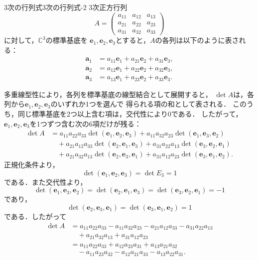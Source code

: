\begin{example}{3次の行列式}{3次の行列式-2}
  $3$次正方行列
  \[
    A=
    \begin{pmatrix}
      a_{11} & a_{12} & a_{13}\\
      a_{21} & a_{22} & a_{23}\\
      a_{31} & a_{32} & a_{33}
    \end{pmatrix}
  \]
  に対して，$\mathbb{C}^3$の標準基底を
  $\bm{e}_1,\bm{e}_2,\bm{e}_3$とすると，$A$の各列は以下のように表される：
  \begin{align*}
    \bm{a}_1&=a_{11}\bm{e}_1+a_{21}\bm{e}_2+a_{31}\bm{e}_3, \\
    \bm{a}_2&=a_{12}\bm{e}_1+a_{22}\bm{e}_2+a_{32}\bm{e}_3, \\
    \bm{a}_3&=a_{13}\bm{e}_1+a_{23}\bm{e}_2+a_{33}\bm{e}_3.
  \end{align*}

  多重線型性により，各列を標準基底の線型結合として展開すると，
  $\det A$は，各列から$\bm{e}_1,\bm{e}_2,\bm{e}_3$のいずれか1つを選んで
  得られる項の和として表される．
  このうち，同じ標準基底を2つ以上含む項は，交代性により$0$である．
  したがって，$\bm{e}_1,\bm{e}_2,\bm{e}_3$を1つずつ含む次の6項だけが残る：
  \begin{align*}
    \det A
    &=
    a_{11}a_{22}a_{33}\det(\bm{e}_1,\bm{e}_2,\bm{e}_3)
    +a_{11}a_{32}a_{23}\det(\bm{e}_1,\bm{e}_3,\bm{e}_2)\\
    &\quad
    +a_{21}a_{12}a_{33}\det(\bm{e}_2,\bm{e}_1,\bm{e}_3)
    +a_{31}a_{22}a_{13}\det(\bm{e}_3,\bm{e}_2,\bm{e}_1)\\
    &\quad
    +a_{21}a_{32}a_{13}\det(\bm{e}_2,\bm{e}_3,\bm{e}_1)
    +a_{31}a_{12}a_{23}\det(\bm{e}_3,\bm{e}_1,\bm{e}_2).
  \end{align*}
  正規化条件より，
  \[
    \det(\bm{e}_1,\bm{e}_2,\bm{e}_3)=\det E_3=1
  \]
  である．また交代性より，
  \[
    \det(\bm{e}_1,\bm{e}_3,\bm{e}_2)
    =\det(\bm{e}_2,\bm{e}_1,\bm{e}_3)
    =\det(\bm{e}_3,\bm{e}_2,\bm{e}_1)=-1
  \]
  であり，
  \[
    \det(\bm{e}_2,\bm{e}_3,\bm{e}_1)
    =\det(\bm{e}_3,\bm{e}_1,\bm{e}_2)=1
  \]
  である．したがって
  \begin{align*}
    \det A
    &=
    a_{11}a_{22}a_{33}
    -a_{11}a_{32}a_{23}
    -a_{21}a_{12}a_{33}
    -a_{31}a_{22}a_{13}\\
    &\quad
    +a_{21}a_{32}a_{13}
    +a_{31}a_{12}a_{23}\\
    &=
    a_{11}a_{22}a_{33}
    +a_{12}a_{23}a_{31}
    +a_{13}a_{21}a_{32}\\
    &\quad
    -a_{11}a_{23}a_{32}
    -a_{12}a_{21}a_{33}
    -a_{13}a_{22}a_{31}.
  \end{align*}
\end{example}


